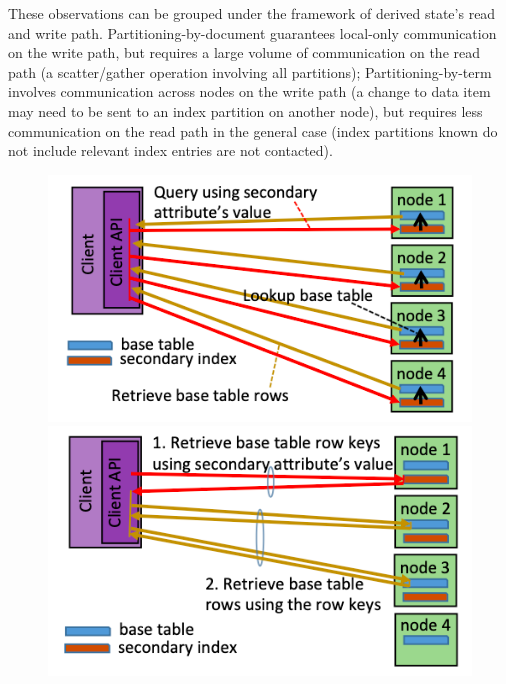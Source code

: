\bigskip

These observations can be grouped under the framework of derived state's read and write path.
Partitioning-by-document guarantees local-only communication on the write path, but requires a large volume of
communication on the read path (a scatter/gather operation involving all partitions);
Partitioning-by-term involves communication across nodes on the write path (a change to data item may need to be sent to
an index partition on another node),
but requires less communication on the read path in the general case
(index partitions known do not include relevant index entries are not contacted).

\begin{figure}
    \centering
    \begin{minipage}{.5\textwidth}
        \centering
        \includegraphics[scale=0.3]{figures/design_space/communication_pattern_document_partitioned.png}
        \caption{}
        \label{fig:prob1_6_2}
    \end{minipage}%
    \begin{minipage}{0.5\textwidth}
        \centering
        \includegraphics[scale=0.3]{figures/design_space/communication_pattern_term_partitioned.png}
        \caption{}
        \label{fig:prob1_6_1}
    \end{minipage}
\end{figure}

